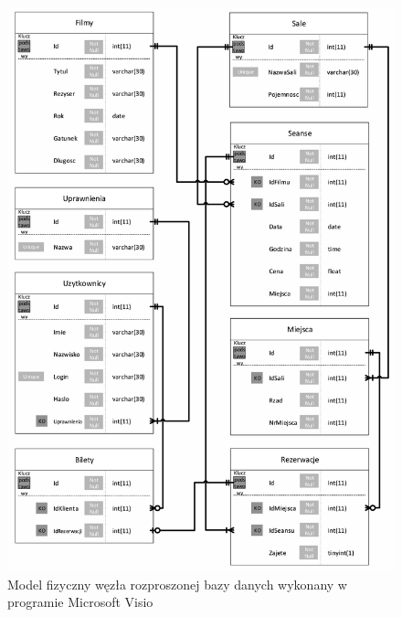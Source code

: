 \begin{figure} [H]
	\centering
	\includegraphics[width=0.95\linewidth]{rozdzial03/model_fizyczny.png}
	\caption{Model fizyczny węzła rozproszonej bazy danych wykonany w programie Microsoft Visio}
	\label{fig:model_fizyczny}
\end{figure}

